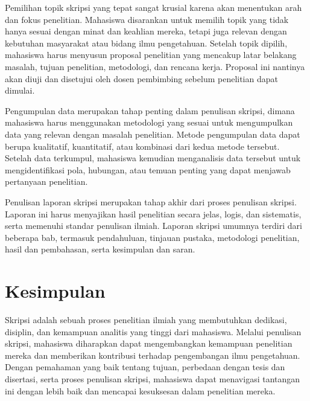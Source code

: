 \documentclass[
  indonesian,
  letterpaper,
  DIV=11,
  numbers=noendperiod]{scrreprt}
\begin{document}
Pemilihan topik skripsi yang tepat sangat krusial karena akan menentukan
arah dan fokus penelitian. Mahasiswa disarankan untuk memilih topik yang
tidak hanya sesuai dengan minat dan keahlian mereka, tetapi juga relevan
dengan kebutuhan masyarakat atau bidang ilmu pengetahuan. Setelah topik
dipilih, mahasiswa harus menyusun proposal penelitian yang mencakup
latar belakang masalah, tujuan penelitian, metodologi, dan rencana
kerja. Proposal ini nantinya akan diuji dan disetujui oleh dosen
pembimbing sebelum penelitian dapat dimulai.

Pengumpulan data merupakan tahap penting dalam penulisan skripsi, dimana
mahasiswa harus menggunakan metodologi yang sesuai untuk mengumpulkan
data yang relevan dengan masalah penelitian. Metode pengumpulan data
dapat berupa kualitatif, kuantitatif, atau kombinasi dari kedua metode
tersebut. Setelah data terkumpul, mahasiswa kemudian menganalisis data
tersebut untuk mengidentifikasi pola, hubungan, atau temuan penting yang
dapat menjawab pertanyaan penelitian.

Penulisan laporan skripsi merupakan tahap akhir dari proses penulisan
skripsi. Laporan ini harus menyajikan hasil penelitian secara jelas,
logis, dan sistematis, serta memenuhi standar penulisan ilmiah. Laporan
skripsi umumnya terdiri dari beberapa bab, termasuk pendahuluan,
tinjauan pustaka, metodologi penelitian, hasil dan pembahasan, serta
kesimpulan dan saran.

\section*{Kesimpulan}\label{kesimpulan}


Skripsi adalah sebuah proses penelitian ilmiah yang membutuhkan
dedikasi, disiplin, dan kemampuan analitis yang tinggi dari mahasiswa.
Melalui penulisan skripsi, mahasiswa diharapkan dapat mengembangkan
kemampuan penelitian mereka dan memberikan kontribusi terhadap
pengembangan ilmu pengetahuan. Dengan pemahaman yang baik tentang
tujuan, perbedaan dengan tesis dan disertasi, serta proses penulisan
skripsi, mahasiswa dapat menavigasi tantangan ini dengan lebih baik dan
mencapai kesuksesan dalam penelitian mereka.
\end{document}
